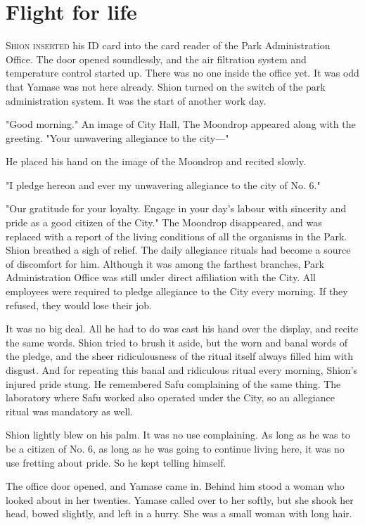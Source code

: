 
\chapter{Flight for life}

\lettrine{S}{hion inserted} his ID card into the card reader of the Park
Administration Office. The door opened soundlessly, and the air
filtration system and temperature control started up. There was no one
inside the office yet. It was odd that Yamase was not here already.
Shion turned on the switch of the park administration system. It was the
start of another work day.

"Good morning." An image of City Hall, The Moondrop appeared along with
the greeting. "Your unwavering allegiance to the city---"

He placed his hand on the image of the Moondrop and recited slowly.

"I pledge hereon and ever my unwavering allegiance to the city of No.
6."

"Our gratitude for your loyalty. Engage in your day's labour with
sincerity and pride as a good citizen of the City." The Moondrop
disappeared, and was replaced with a report of the living conditions of
all the organisms in the Park. Shion breathed a sigh of relief. The
daily allegiance rituals had become a source of discomfort for him.
Although it was among the farthest branches, Park Administration Office
was still under direct affiliation with the City. All employees were
required to pledge allegiance to the City every morning. If they
refused, they would lose their job.

It was no big deal. All he had to do was cast his hand over the display,
and recite the same words. Shion tried to brush it aside, but the worn
and banal words of the pledge, and the sheer ridiculousness of the
ritual itself always filled him with disgust. And for repeating this
banal and ridiculous ritual every morning, Shion's injured pride stung.
He remembered Safu complaining of the same thing. The laboratory where
Safu worked also operated under the City, so an allegiance ritual was
mandatory as well.

Shion lightly blew on his palm. It was no use complaining. As long as he
was to be a citizen of No. 6, as long as he was going to continue living
here, it was no use fretting about pride. So he kept telling himself.

The office door opened, and Yamase came in. Behind him stood a woman who
looked about in her twenties. Yamase called over to her softly, but she
shook her head, bowed slightly, and left in a hurry. She was a small
woman with long hair.

